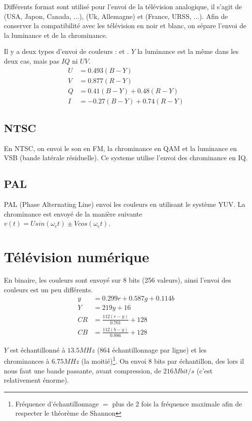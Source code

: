 Différents format sont utilisé pour l'envoi de la télévision analogique, il s'agit de  (USA, Japon, Canada, ...),  (Uk, Allemagne) et  (France, URSS, ...). Afin de conserver la compatibilité avec les télévision en noir et blanc, on sépare l'envoi de la luminance et de la chrominance.

Il y a deux types d'envoi de couleurs :  et . $Y$ la luminance est la même dans les deux cas, mais pas $IQ$ ni $UV$.
\begin{align*}
U &= 0.493 (B - Y)\\
V &= 0.877 (R - Y)\\
Q &= 0.41(B-Y)+0.48(R-Y)\\
I &= -0.27(B-Y)+0.74(R-Y)
\end{align*}

\subsection{NTSC}

En NTSC, on envoi le son en FM, la chrominance en QAM et la luminance en VSB (bande latérale résiduelle). Ce systeme utilise l'envoi des chrominance en IQ.

\subsection{PAL}

PAL (Phase Alternating Line) envoi les couleurs en utilisant le système YUV. La chrominance est envoyé de la manière suivante $v(t)=U sin(\omega_c t) \pm V cos(\omega_c t)$.

\section{Télévision numérique}

En binaire, les couleurs sont envoyé sur 8 bits (256 valeurs), ainsi l'envoi des couleurs est un peu différents.
\begin{align*}
y &= 0.299 r + 0.587 g + 0.114 b\\
Y &= 219y + 16\\
CR &= \frac{112(r-y)}{0.701}+128\\
CB &= \frac{112(b-y)}{0.886}+128
\end{align*}

$Y$ est échantillonné à $13.5MHz$ (864 échantillonnage par ligne) et les chrominances à $6.75MHz$ (la moitié)\footnote{Fréquence d'échantillonnage $=$ plus de 2 fois la fréquence maximale afin de respecter le théorème de Shannon}. On envoi 8 bits par échantillon, des lors il nous faut une bande passante, avant compression, de $216Mbit/s$ (c'est relativement énorme).

